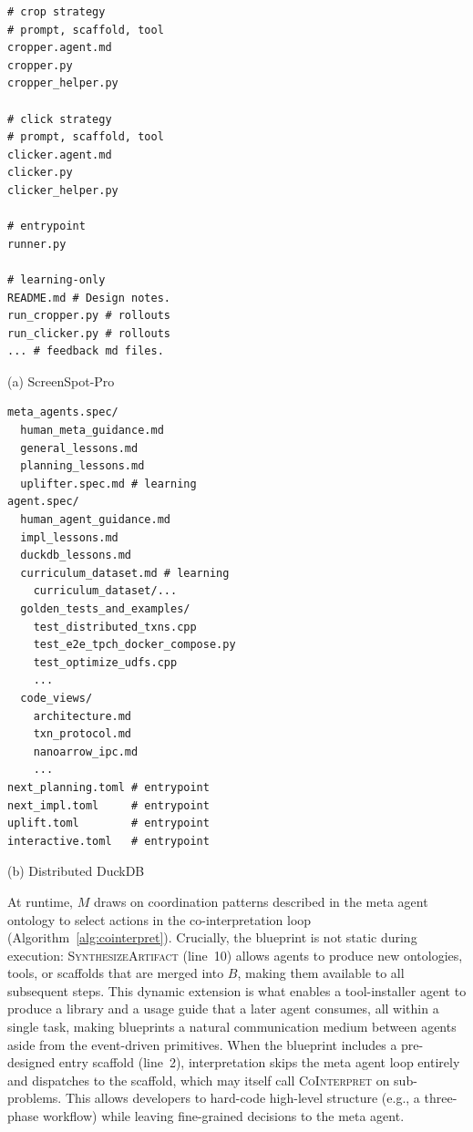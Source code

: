 \begin{listing}[t]
\begin{minipage}[t]{0.38\columnwidth}
\begin{lstlisting}[rulecolor=\color{accentShell}]
# crop strategy
# prompt, scaffold, tool
cropper.agent.md
cropper.py
cropper_helper.py

# click strategy
# prompt, scaffold, tool
clicker.agent.md
clicker.py
clicker_helper.py

# entrypoint
runner.py

# learning-only
README.md # Design notes.
run_cropper.py # rollouts
run_clicker.py # rollouts
... # feedback md files.
\end{lstlisting}
\centerline{\scriptsize (a) ScreenSpot-Pro}
\end{minipage}\hfill
\begin{minipage}[t]{0.60\columnwidth}
\begin{lstlisting}[rulecolor=\color{accentShell}]
meta_agents.spec/
  human_meta_guidance.md
  general_lessons.md
  planning_lessons.md
  uplifter.spec.md # learning
agent.spec/
  human_agent_guidance.md
  impl_lessons.md
  duckdb_lessons.md
  curriculum_dataset.md # learning
    curriculum_dataset/...
  golden_tests_and_examples/
    test_distributed_txns.cpp
    test_e2e_tpch_docker_compose.py
    test_optimize_udfs.cpp
    ...
  code_views/
    architecture.md
    txn_protocol.md
    nanoarrow_ipc.md
    ...
next_planning.toml # entrypoint
next_impl.toml     # entrypoint
uplift.toml        # entrypoint
interactive.toml   # entrypoint
\end{lstlisting}
\centerline{\scriptsize (b) Distributed DuckDB}
\end{minipage}
\caption{Blueprints at different scales. (a)~A minimal, static blueprint (\cref{sec:evaluation}). (b)~A production blueprint that evolves online and offline. Names and structure are simplified for readability.}
\label{lst:blueprints}
\end{listing}

At runtime, $M$ draws on coordination patterns described in the meta agent ontology to select actions in the co-interpretation loop (Algorithm~\ref{alg:cointerpret}).
Crucially, the blueprint is not static during execution: \textsc{SynthesizeArtifact} (line~10) allows agents to produce new ontologies, tools, or scaffolds that are merged into $B$, making them available to all subsequent steps.
This dynamic extension is what enables a tool-installer agent to produce a library and a usage guide that a later agent consumes, all within a single task, making blueprints a natural communication medium between agents aside from the event-driven primitives.
When the blueprint includes a pre-designed entry scaffold (line~2), interpretation skips the meta agent loop entirely and dispatches to the scaffold, which may itself call \textsc{CoInterpret} on sub-problems.
This allows developers to hard-code high-level structure (e.g., a three-phase workflow) while leaving fine-grained decisions to the meta agent.


